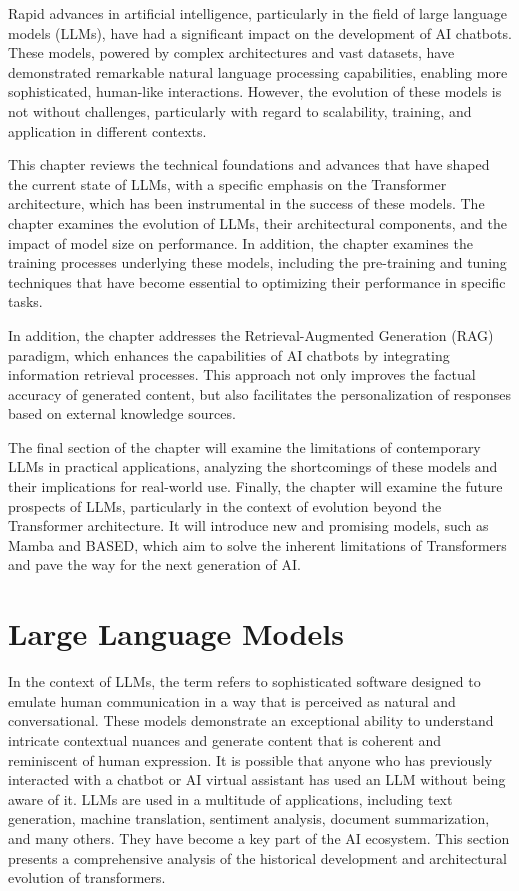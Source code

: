 Rapid advances in artificial intelligence, particularly in the field of large language models (LLMs), have had a significant impact on the development of AI chatbots. These models, powered by complex architectures and vast datasets, have demonstrated remarkable natural language processing capabilities, enabling more sophisticated, human-like interactions. However, the evolution of these models is not without challenges, particularly with regard to scalability, training, and application in different contexts.

This chapter reviews the technical foundations and advances that have shaped the current state of LLMs, with a specific emphasis on the Transformer architecture, which has been instrumental in the success of these models. The chapter examines the evolution of LLMs, their architectural components, and the impact of model size on performance. In addition, the chapter examines the training processes underlying these models, including the pre-training and tuning techniques that have become essential to optimizing their performance in specific tasks.

In addition, the chapter addresses the Retrieval-Augmented Generation (RAG) paradigm, which enhances the capabilities of AI chatbots by integrating information retrieval processes. This approach not only improves the factual accuracy of generated content, but also facilitates the personalization of responses based on external knowledge sources.

The final section of the chapter will examine the limitations of contemporary LLMs in practical applications, analyzing the shortcomings of these models and their implications for real-world use. Finally, the chapter will examine the future prospects of LLMs, particularly in the context of evolution beyond the Transformer architecture. It will introduce new and promising models, such as Mamba and BASED, which aim to solve the inherent limitations of Transformers and pave the way for the next generation of AI.

\section{Large Language Models}

In the context of LLMs, the term refers to sophisticated software designed to emulate human communication in a way that is perceived as natural and conversational. These models demonstrate an exceptional ability to understand intricate contextual nuances and generate content that is coherent and reminiscent of human expression. It is possible that anyone who has previously interacted with a chatbot or AI virtual assistant has used an LLM without being aware of it. LLMs are used in a multitude of applications, including text generation, machine translation, sentiment analysis, document summarization, and many others. They have become a key part of the AI ecosystem. This section presents a comprehensive analysis of the historical development and architectural evolution of transformers.

